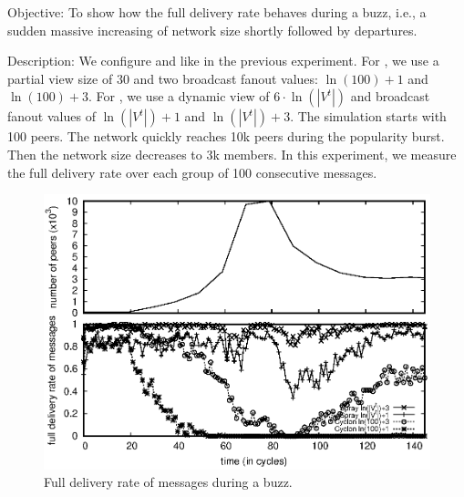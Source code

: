 \begin{asparadesc}
\item [Objective:] To show how the full delivery rate behaves during a buzz,
  i.e., a sudden massive increasing of network size shortly followed by
  departures.
\item [Description:] We configure \SPRAY and \CYCLON like in the
  previous experiment. For \CYCLON, we use a partial view size of 30
  and two broadcast fanout values: $\ln(100)+1$ and $\ln(100)+3$. For
  \SPRAY, we use a dynamic view of $6 \cdot \ln(|V^t|)$ and broadcast
  fanout values of $\ln(|V^t|)+1$ and $\ln(|V^t|)+3$. The simulation
  starts with 100 peers. The network quickly reaches 10k peers during
  the popularity burst. Then the network size decreases to 3k
  members. In this experiment, we measure the full delivery rate over
  each group of 100 consecutive messages.

\begin{figure}
  \begin{center}
    \includegraphics[width=\SCALE\textwidth]{img/peak.eps}
    \caption{\label{fig:peak}Full delivery rate of messages during a buzz.}
  \end{center}
\end{figure}


\end{asparadesc}
